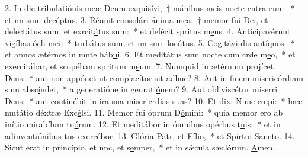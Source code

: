2. In die tribulatiónis meæ Deum exquisívi,~† mánibus meis nocte cntra \uline{e}um:~* et nn sum dec\uline{é}ptus.
3. Rénuit consolári ánima mea:~† memor fui Dei, et delectátus sum, et exrcit\uline{á}tus sum:~* et defécit spritus m\uline{e}us.
4. Anticipavérunt vigílias ócli m\uline{e}i:~* turbátus sum, et nn sum loc\uline{ú}tus.
5. Cogitávi dis ant\uline{í}quos:~* et annos ætérnos in mnte háb\uline{u}i.
6. Et meditátus sum nocte cum crde m\uline{e}o,~* et exercitábar, et scopébam spritum m\uline{e}um.
7. Numquid in ætérnum projícet D\uline{e}us:~* aut non appónet ut complacítor sit \uline{a}dhuc?
8. Aut in finem misericórdiam sum absc\uline{í}ndet,~* a generatióne in genrati\uline{ó}nem?
9. Aut obliviscétur miserri D\uline{e}us:~* aut continébit in ira sua misericrdias s\uline{u}as?
10. Et dix: Nunc c\uline{œ}pi:~* hæc mutátio déxtræ Exc\uline{é}lsi.
11. Memor fui óprum D\uline{ó}mini:~* quia memor ero ab inítio mirabílum tu\uline{ó}rum.
12. Et meditábor in ómnibus opérbus t\uline{u}is:~* et in adinventiónibus tus exerc\uline{é}bor.
13. Glória Patr, et F\uline{í}lio,~* et Spirtui S\uline{a}ncto.
14. Sicut erat in princípio, et nnc, et s\uline{e}mper,~* et in sǽcula sæclórum. \uline{A}men.
